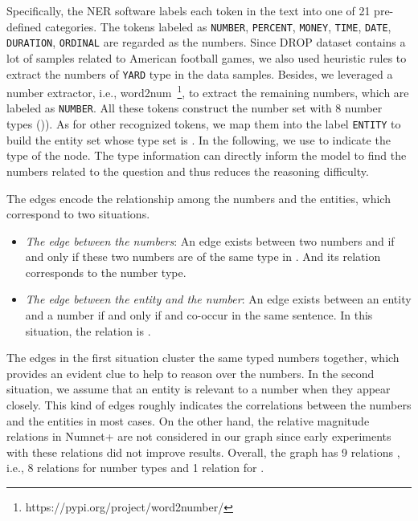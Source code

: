 \documentclass{article}
\begin{document}
Specifically, the NER software labels each token in the text into one of 21 pre-defined categories.
The tokens labeled as \texttt{NUMBER}, \texttt{PERCENT}, \texttt{MONEY}, \texttt{TIME}, \texttt{DATE}, \texttt{DURATION}, \texttt{ORDINAL} are regarded as the numbers.
Since DROP dataset contains a lot of samples related to American football games, we also used heuristic rules to extract the numbers of \texttt{YARD} type in the data samples.
Besides, we leveraged a number extractor, i.e., word2num~\footnote{https://pypi.org/project/word2number/}, to extract the remaining numbers, which are labeled as \texttt{NUMBER}.
All these tokens construct the number set  with 8 number types ()). 
As for other recognized tokens,  we map them into the label \texttt{ENTITY} to build the entity set  whose type set  is .
In the following, we use  to indicate the type of the node.
The type information can directly inform the model to find the numbers related to the question and thus reduces the reasoning difficulty.

The edges  encode the relationship among the numbers and the entities, which correspond to two situations.
\begin{itemize}[leftmargin=*,nolistsep,nosep]
\setlength\itemsep{0.5em}
\item \textit{The edge between the numbers}: An edge  exists between two numbers  and  if and only if these two numbers are of the same type in . And its relation  corresponds to the number type.
\item \textit{The edge between the entity and the number}: An edge  exists between an entity  and a number  if and only if  and  co-occur in the same sentence. In this situation, the relation  is .
\end{itemize}
The edges in the first situation cluster the same typed numbers together, which provides an evident clue to help to reason over the numbers.
In the second situation, we assume that an entity is relevant to a number when they appear closely.
This kind of edges roughly indicates the correlations between the numbers and the entities in most cases. On the other hand, the relative magnitude relations in Numnet+ are not considered in our graph since early experiments with these relations did not improve results.
Overall, the graph has 9 relations , i.e., 8 relations for number types and 1 relation for . 
\end{document}
